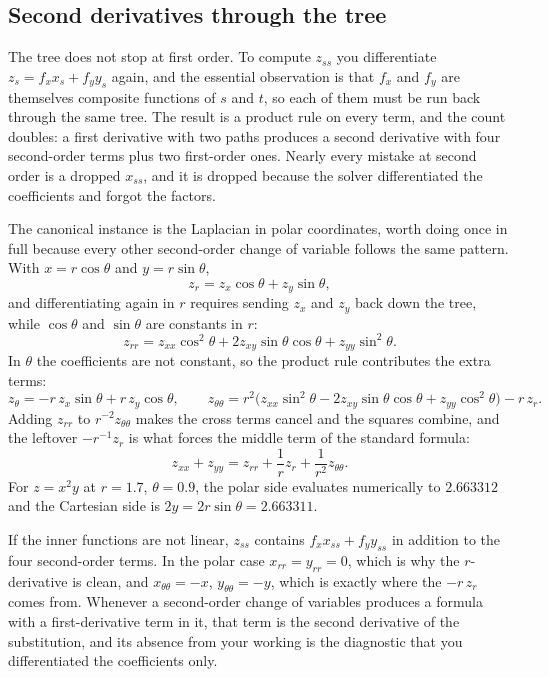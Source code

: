 \subsection{Second derivatives through the tree}

The tree does not stop at first order. To compute $z_{ss}$ you differentiate $z_{s}=f_{x}x_{s}+f_{y}y_{s}$ again, and the essential observation is that $f_{x}$ and $f_{y}$ are themselves composite functions of $s$ and $t$, so each of them must be run back through the same tree. The result is a product rule on every term, and the count doubles: a first derivative with two paths produces a second derivative with four second-order terms plus two first-order ones. Nearly every mistake at second order is a dropped $x_{ss}$, and it is dropped because the solver differentiated the coefficients and forgot the factors.

The canonical instance is the Laplacian in polar coordinates, worth doing once in full because every other second-order change of variable follows the same pattern. With $x=r\cos\theta$ and $y=r\sin\theta$,
\[
z_{r}=z_{x}\cos\theta+z_{y}\sin\theta ,
\]
and differentiating again in $r$ requires sending $z_{x}$ and $z_{y}$ back down the tree, while $\cos\theta$ and $\sin\theta$ are constants in $r$:
\[
z_{rr}=z_{xx}\cos^{2}\theta+2z_{xy}\sin\theta\cos\theta+z_{yy}\sin^{2}\theta .
\]
In $\theta$ the coefficients are not constant, so the product rule contributes the extra terms:
\[
z_{\theta}=-r\,z_{x}\sin\theta+r\,z_{y}\cos\theta,\qquad
z_{\theta\theta}=r^{2}\bigl(z_{xx}\sin^{2}\theta-2z_{xy}\sin\theta\cos\theta+z_{yy}\cos^{2}\theta\bigr)-r\,z_{r}.
\]
Adding $z_{rr}$ to $r^{-2}z_{\theta\theta}$ makes the cross terms cancel and the squares combine, and the leftover $-r^{-1}z_{r}$ is what forces the middle term of the standard formula:
\[
z_{xx}+z_{yy}=z_{rr}+\frac1r z_{r}+\frac1{r^{2}}z_{\theta\theta}.
\]
For $z=x^{2}y$ at $r=1.7$, $\theta=0.9$, the polar side evaluates numerically to $2.663312$ and the Cartesian side is $2y=2r\sin\theta=2.663311$.

\begin{keynote}
If the inner functions are not linear, $z_{ss}$ contains $f_{x}x_{ss}+f_{y}y_{ss}$ in addition to the four second-order terms. In the polar case $x_{rr}=y_{rr}=0$, which is why the $r$-derivative is clean, and $x_{\theta\theta}=-x$, $y_{\theta\theta}=-y$, which is exactly where the $-r\,z_{r}$ comes from. Whenever a second-order change of variables produces a formula with a first-derivative term in it, that term is the second derivative of the substitution, and its absence from your working is the diagnostic that you differentiated the coefficients only.
\end{keynote}

